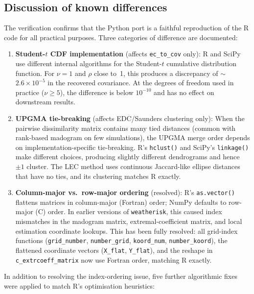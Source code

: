 \documentclass[a4paper]{elsarticle}
\begin{document}
\subsection{Discussion of known differences}

The verification confirms that the Python port is a faithful reproduction
of the R code for all practical purposes.
Three categories of difference are documented:

\begin{enumerate}
\item \textbf{Student-$t$ CDF implementation} (affects \texttt{ec\_to\_cov} only):
  R and SciPy use different internal algorithms for the Student-$t$
  cumulative distribution function.  For $\nu = 1$ and $\rho$ close to~1,
  this produces a discrepancy of $\sim$$2.6 \times 10^{-5}$ in the
  recovered covariance.
  At the degrees of freedom used in practice ($\nu \geq 5$), the
  difference is below $10^{-10}$ and has no effect on downstream results.

\item \textbf{UPGMA tie-breaking} (affects EDC/Saunders clustering only):
  When the pairwise dissimilarity matrix contains many tied distances
  (common with rank-based madogram on few simulations), the
  UPGMA merge order depends on implementation-specific tie-breaking.
  R's \texttt{hclust()} and SciPy's \texttt{linkage()} make
  different choices, producing slightly different dendrograms
  and hence $\pm 1$ cluster.
  The LEC method uses continuous Jaccard-like ellipse distances
  that have no ties, and its clustering matches R exactly.

\item \textbf{Column-major vs.\ row-major ordering} (resolved):
  R's \texttt{as.vector()} flattens matrices in column-major (Fortran)
  order; NumPy defaults to row-major (C) order.
  In earlier versions of \texttt{weatherisk}, this caused index
  mismatches in the madogram matrix, extremal-coefficient matrix,
  and local estimation coordinate lookups.
  This has been fully resolved: all grid-index functions
  (\texttt{grid\_number}, \texttt{number\_grid}, \texttt{koord\_num},
  \texttt{number\_koord}), the flattened coordinate vectors
  (\texttt{X\_flat}, \texttt{Y\_flat}), and the reshape in
  \texttt{c\_extrcoeff\_matrix} now use Fortran order,
  matching R exactly.
\end{enumerate}

In addition to resolving the index-ordering issue, five further
algorithmic fixes were applied to match R's optimisation heuristics:
\end{document}
